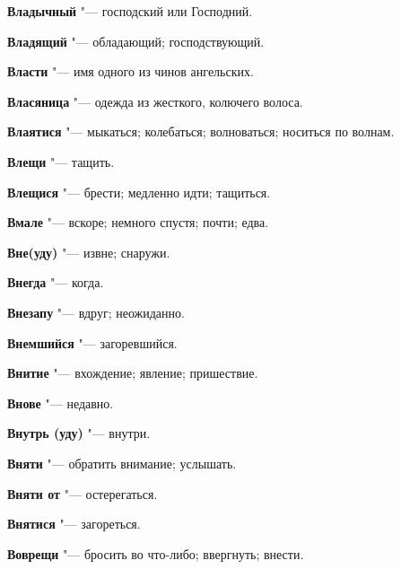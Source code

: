 \begin{mymulticols}{2}
\noindent\textbf{Владычный} "--- господский или Господний. 




\noindent\textbf{Владящий} "--- обладающий; господствующий. 




\noindent\textbf{Власти} "--- имя одного из чинов ангельских. 




\noindent\textbf{Власяница} "--- одежда из жесткого, колючего волоса. 




\noindent\textbf{Влаятися} "--- мыкаться; колебаться; волноваться; носиться по волнам. 




\noindent\textbf{Влещи} "--- тащить. 




\noindent\textbf{Влещися} "--- брести; медленно идти; тащиться. 




\noindent\textbf{Вмале} "--- вскоре; немного спустя; почти; едва. 




\noindent\textbf{Вне(уду)} "--- извне; снаружи. 




\noindent\textbf{Внегда} "--- когда. 




\noindent\textbf{Внезапу} "--- вдруг; неожиданно. 




\noindent\textbf{Внемшийся} "--- загоревшийся. 




\noindent\textbf{Внитие} "--- вхождение; явление; пришествие. 




\noindent\textbf{Внове} "--- недавно. 




\noindent\textbf{Внутрь (уду)} "--- внутри. 




\noindent\textbf{Вняти} "--- обратить внимание; услышать. 




\noindent\textbf{Вняти от} "--- остерегаться. 




\noindent\textbf{Внятися} "--- загореться. 




\noindent\textbf{Воврещи} "--- бросить во что-либо; ввергнуть; внести. 





\end{mymulticols}
